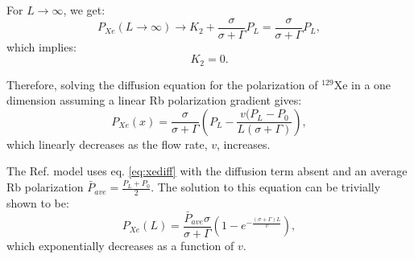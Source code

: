 For $L \to \infty$, we get:
\begin{equation}
    P_{Xe}(L\to\infty) \to K_2+\frac{\sigma}{\sigma+\Gamma}P_L = \frac{\sigma}{\sigma+\Gamma}P_L,
\end{equation}
which implies:
\begin{equation}
    K_2=0.
\end{equation}

Therefore, solving the diffusion equation for the polarization of $^{129}$Xe  in a one dimension assuming a linear Rb polarization gradient gives:
\begin{equation}
    P_{Xe}(x) = \frac{\sigma}{\sigma+\Gamma}\left(P_L-\frac{v(P_L-P_0}{L(\sigma+\Gamma)}\right),
\end{equation}
which linearly decreases as the flow rate, $v$, increases.

The Ref. \cite{Freeman2014} model uses eq. \ref{eq:xediff} with the diffusion term absent and an average Rb polarization $\bar P_{ave} = \frac{P_L+P_0}{2}$. The solution to this equation can be trivially shown to be:
\begin{equation}
    P_{Xe}(L) = \frac{\bar P_{ave} \sigma}{\sigma+\Gamma}\left(1-e^{-\frac{(\sigma+\Gamma)L}{v}}\right),
\end{equation}
which exponentially decreases as a function of $v$.